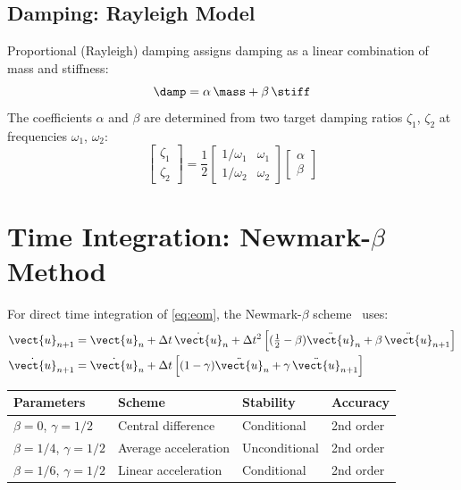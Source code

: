 \subsection{Damping: Rayleigh Model}

Proportional (Rayleigh) damping assigns damping as a linear combination of
mass and stiffness:
\begin{equation}
    \damp = \alpha\,\mass + \beta\,\stiff
    \label{eq:rayleigh}
\end{equation}
The coefficients $\alpha$ and $\beta$ are determined from two target damping
ratios $\zeta_1$, $\zeta_2$ at frequencies $\omega_1$, $\omega_2$:
\begin{equation}
    \begin{bmatrix} \zeta_1 \\ \zeta_2 \end{bmatrix} = \frac{1}{2}
    \begin{bmatrix} 1/\omega_1 & \omega_1 \\ 1/\omega_2 & \omega_2 \end{bmatrix}
    \begin{bmatrix} \alpha \\ \beta \end{bmatrix}
    \label{eq:rayleigh_coeff}
\end{equation}

\section{Time Integration: Newmark-$\beta$ Method}

For direct time integration of \cref{eq:eom}, the Newmark-$\beta$ scheme~\cite{newmark1959method,clough1993dynamics}
uses:
\begin{align}
    \vect{u}_{n+1} &= \vect{u}_n + \Delta t\,\dot{\vect{u}}_n
                     + \Delta t^2\left[(\tfrac{1}{2}-\beta)\ddot{\vect{u}}_n
                     + \beta\,\ddot{\vect{u}}_{n+1}\right]
    \label{eq:newmark_u} \\
    \dot{\vect{u}}_{n+1} &= \dot{\vect{u}}_n
                           + \Delta t\left[(1-\gamma)\ddot{\vect{u}}_n
                           + \gamma\,\ddot{\vect{u}}_{n+1}\right]
    \label{eq:newmark_v}
\end{align}

\begin{center}
\begin{tabular}{@{}llll@{}}
    \toprule
    Parameters & Scheme & Stability & Accuracy \\
    \midrule
    $\beta=0$, $\gamma=1/2$ & Central difference & Conditional & 2nd order \\
    $\beta=1/4$, $\gamma=1/2$ & Average acceleration & Unconditional & 2nd order \\
    $\beta=1/6$, $\gamma=1/2$ & Linear acceleration & Conditional & 2nd order \\
    \bottomrule
\end{tabular}
\end{center}

